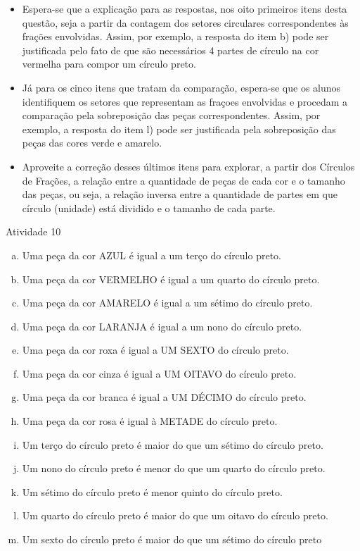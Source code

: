 \begin{multicols}{2}
\begin{itemize}
    \item Espera-se que a explicação para as respostas, nos oito primeiros itens desta questão, seja a partir da contagem dos setores circulares correspondentes às frações envolvidas. Assim, por exemplo, a resposta do item b) pode ser justificada pelo fato de que são necessários 4 partes de círculo na cor vermelha para compor um círculo preto.
    \item Já para os cinco itens que tratam da comparação, espera-se que os alunos identifiquem os setores que representam as fraçoes envolvidas e procedam a comparação pela sobreposição das peças correspondentes. Assim, por exemplo, a resposta do item l) pode ser justificada pela sobreposição das peças das cores verde e amarelo.
    \item Aproveite a correção desses últimos itens para explorar, a partir dos Círculos de Frações, a relação entre a quantidade de peças de cada cor e o tamanho das peças, ou seja, a relação inversa entre a quantidade de partes em que círculo (unidade) está dividido e o tamanho de cada parte.
\end{itemize}


\begin{resposta*}{Atividade 10}
\begin{enumerate}[a)]
 \item Uma peça da cor AZUL é igual a um terço do círculo preto.
 \item    Uma peça da cor VERMELHO é igual a um quarto do círculo preto.
 \item    Uma peça da cor AMARELO é igual a um sétimo do círculo preto.
 \item    Uma peça da cor LARANJA é igual a um nono do círculo preto.
 \item    Uma peça da cor roxa é igual a UM SEXTO do círculo preto.
 \item    Uma peça da cor cinza é igual a UM OITAVO do círculo preto.
 \item    Uma peça da cor branca é igual a UM DÉCIMO do círculo preto.
 \item    Uma peça da cor rosa é igual à METADE do círculo preto.
 \item    Um terço do círculo preto é maior do que um sétimo do círculo preto.
 \item    Um nono do círculo preto é menor do que um quarto do círculo preto.
 \item    Um sétimo do círculo preto é menor quinto do círculo preto.
 \item    Um quarto do círculo preto é maior do que um oitavo do círculo preto.
 \item    Um sexto do círculo preto é maior do que um sétimo do círculo preto
\end{enumerate}


\end{resposta*}
\end{multicols}
